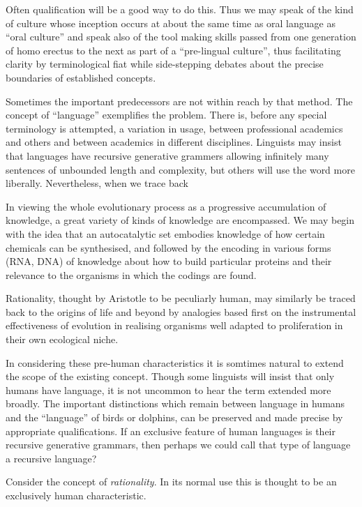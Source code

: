 \documentclass[10pt,titlepage]{book}
\begin{document}
Often qualification will be a good way to do this.
Thus we may speak of the kind of culture whose inception occurs at about the same time as oral language as ``oral culture'' and speak also of the tool making skills passed from one generation of homo erectus to the next as part of a ``pre-lingual culture'', thus facilitating clarity by terminological fiat while side-stepping debates about the precise boundaries of established concepts.

Sometimes the important predecessors are not within reach by that method.
The concept of ``language'' exemplifies the problem.
There is, before any special terminology is attempted, a variation in usage, between professional academics and others and between academics in different disciplines.
Linguists may insist that languages have recursive generative grammers allowing infinitely many sentences of unbounded length and complexity, but others will use the word more liberally.
Nevertheless, when we trace back 

In viewing the whole evolutionary process as a progressive accumulation of knowledge, a great variety of kinds of knowledge are encompassed.
We may begin with the idea that an autocatalytic set embodies knowledge of how certain chemicals can be synthesised, and followed by the encoding in various forms (RNA, DNA) of knowledge about how to build particular proteins and their relevance to the organisms in which the codings are found.

Rationality, thought by Aristotle to be peculiarly human, may similarly be traced back to the origins of life and beyond by analogies based first on the instrumental effectiveness of evolution in realising organisms well adapted to proliferation in their own ecological niche.


In considering these pre-human characteristics it is somtimes natural to extend the scope of the existing concept.
Though some linguists will insist that only humans have language, it is not uncommon to hear the term extended more broadly.
The important distinctions which remain between language in humans and the ``language'' of birds or dolphins, can be preserved and made precise by appropriate qualifications.
If an exclusive feature of human languages is their recursive generative grammars, then perhaps we could call that type of language a recursive language?

Consider the concept of \emph{rationality}.
In its normal use this is thought to be an exclusively human characteristic.
\end{document}
